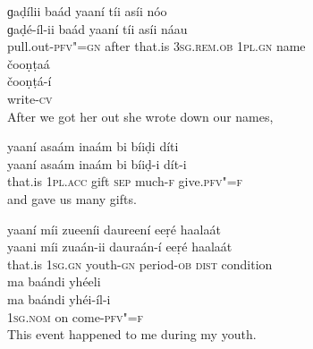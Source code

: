 \begin{exe}
\ex
\label{ex:25}
\glll ɡaḍílii	baád	yaaní	tíi	asíi	nóo \\
ɡaḍé-íl-ii	baád	yaaní	tíi	asíi	náau \\
pull.out-\textsc{pfv"=gn}	after	that.is	\textsc{3sg.rem.ob}	\textsc{1pl.gn}	name \\
\glll čooṇṭaá \\
čooṇṭá-í \\
write-\textsc{cv} \\
\glt After we got her out she wrote down our names,

\ex
\label{ex:26}
\glll yaaní	asaám	inaám	bi	bíiḍi	díti \\
yaaní	asaám	inaám	bi	bíiḍ-i	dít-i \\
that.is	\textsc{1pl.acc}	gift \textsc{sep}	much-\textsc{f}	give.\textsc{pfv"=f} \\
\glt and gave us many gifts.

\ex
\label{ex:27}
\glll yaaní	míi	zueeníi	daureení	eeṛé	haalaát \\
yaani	míi	zuaán-ii	dauraán-í	eeṛé	haalaát \\
that.is	\textsc{1sg.gn}	youth-\textsc{gn}	period-\textsc{ob}	\textsc{dist}	condition \\
\glll ma	baándi	yhéeli \\
ma	baándi	yhéi-íl-i \\
\textsc{1sg.nom}	on	come-\textsc{pfv"=f} \\
\glt This event happened to me during my youth.

\end{exe}